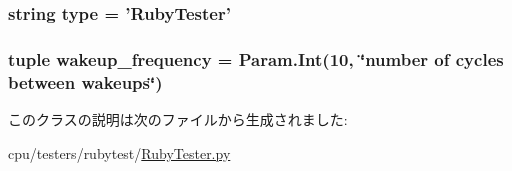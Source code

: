 \label{classRubyTester_1_1RubyTester_ab737471139f5a296e5b26e8a0e1b0744}
\hypertarget{classRubyTester_1_1RubyTester_acce15679d830831b0bbe8ebc2a60b2ca}{
\subsubsection[{type}]{\setlength{\rightskip}{0pt plus 5cm}string {\bf type} = '{\bf RubyTester}'}}
\label{classRubyTester_1_1RubyTester_acce15679d830831b0bbe8ebc2a60b2ca}
\hypertarget{classRubyTester_1_1RubyTester_afa63d4d75218cbaf8106b3cff83ab404}{
\subsubsection[{wakeup\_\-frequency}]{\setlength{\rightskip}{0pt plus 5cm}tuple {\bf wakeup\_\-frequency} = Param.Int(10, \char`\"{}number of cycles between wakeups\char`\"{})}}
\label{classRubyTester_1_1RubyTester_afa63d4d75218cbaf8106b3cff83ab404}


このクラスの説明は次のファイルから生成されました:\begin{DoxyCompactItemize}
\item 
cpu/testers/rubytest/\hyperlink{RubyTester_8py}{RubyTester.py}\end{DoxyCompactItemize}
